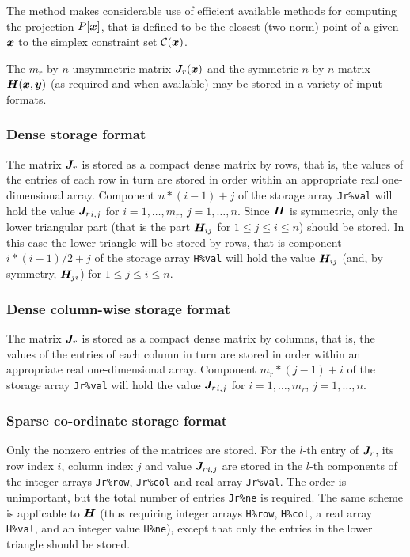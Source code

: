 \documentclass{galahad}
\begin{document}
The method makes considerable use of efficient available methods for computing 
the projection $P[{\bm{x}}]$, that is defined to be the closest (two-norm) point 
of a given ${\bm{x}}$ to the simplex constraint set $\calC(\bmx)$. 


\galmatrix The $m_r$ by $n$ unsymmetric matrix ${\bm{J}}_r({\bm{x}})$ and 
the symmetric $n$ by $n$ matrix ${\bm{H}}({\bm{x}},{\bm{y}})$
(as required and when available) may be stored in a variety of input formats.

\subsubsection{Dense storage format}\label{dense}
The matrix ${\bm{J}}_r$ is stored as a compact
dense matrix by rows, that is, the values of the entries of each row in turn are
stored in order within an appropriate real one-dimensional array.
Component $n \ast (i-1) + j$ of the storage array {\tt  Jr\%val} will hold 
the value ${{\bm{J}}_r}_{i,j}$ for $i = 1, \ldots , m_r$, $j = 1, \ldots , n$. 
Since ${\bm{H}}$ is symmetric, only the lower triangular
part (that is the part ${\bm{H}}_{ij}$ for $1 \leq j \leq i \leq n$)
should be stored. In this case the lower triangle will be stored by rows,
that is component $i \ast (i-1)/2 + j$ of the storage array {\tt H\%val} will
hold the value ${\bm{H}}_{ij}$ (and, by symmetry, ${\bm{H}}_{ji}$) for $1 \leq j
\leq i \leq n$.

\subsubsection{Dense column-wise storage format}\label{dense-column}
The matrix ${\bm{J}}_r$ is stored as a compact
dense matrix by columns, that is, the values of the entries of each column
in turn are stored in order within an appropriate real one-dimensional array.
Component $m_r \ast (j-1) + i$ of the storage array {\tt  Jr\%val} will 
hold the value ${{\bm{J}}_r}_{i,j}$ for $i = 1, \ldots , m_r$, $j = 1, \ldots , n$.

\subsubsection{Sparse co-ordinate storage format}\label{coordinate}
Only the nonzero entries of the matrices are stored. For the $l$-th
entry of ${\bm{J}}_r$, its row index $i$, column index $j$ and value
${{\bm{J}}_r}_{i,j}$ are stored in the $l$-th components of the integer arrays
{\tt Jr\%row}, {\tt Jr\%col} and real array {\tt Jr\%val}.
The order is unimportant, but the total number of entries {\tt Jr\%ne} is
required.  The same scheme is applicable to ${\bm{H}}$
(thus requiring integer arrays {\tt H\%row}, {\tt H\%col}, a real
array {\tt H\%val}, and an integer value {\tt H\%ne}), except that only
the entries in the lower triangle should be stored.
\end{document}
